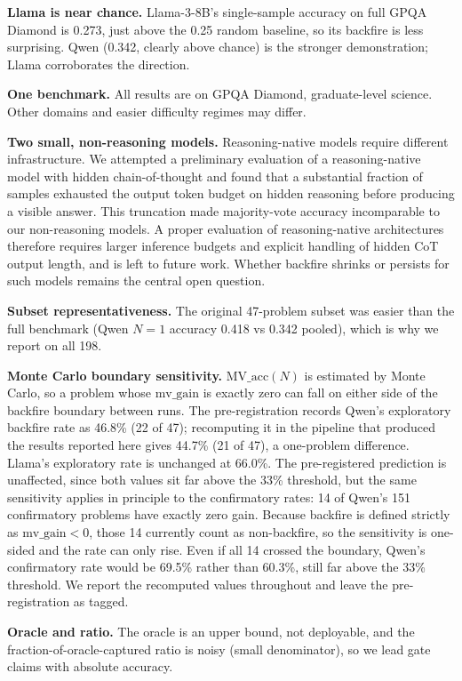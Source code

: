 \documentclass{article}
\begin{document}
\textbf{Llama is near chance.} Llama-3-8B's single-sample accuracy on full
GPQA Diamond is 0.273, just above the 0.25 random baseline, so its backfire
is less surprising. Qwen (0.342, clearly above chance) is the stronger
demonstration; Llama corroborates the direction.

\textbf{One benchmark.} All results are on GPQA Diamond, graduate-level
science. Other domains and easier difficulty regimes may differ.

\textbf{Two small, non-reasoning models.} Reasoning-native models require
different infrastructure. We attempted a preliminary evaluation of a
reasoning-native model with hidden chain-of-thought and found that a
substantial fraction of samples exhausted the output token budget on hidden
reasoning before producing a visible answer. This truncation made
majority-vote accuracy incomparable to our non-reasoning models. A proper
evaluation of reasoning-native architectures therefore requires larger
inference budgets and explicit handling of hidden CoT output length, and is
left to future work. Whether backfire shrinks or persists for such models
remains the central open question.

\textbf{Subset representativeness.} The original 47-problem subset was easier
than the full benchmark (Qwen $N=1$ accuracy 0.418 vs 0.342 pooled), which is
why we report on all 198.

\textbf{Monte Carlo boundary sensitivity.} $\text{MV\_acc}(N)$ is estimated by
Monte Carlo, so a problem whose $\text{mv\_gain}$ is exactly zero can fall on
either side of the backfire boundary between runs. The pre-registration records
Qwen's exploratory backfire rate as 46.8\% (22 of 47); recomputing it in the
pipeline that produced the results reported here gives 44.7\% (21 of 47), a
one-problem difference. Llama's exploratory rate is unchanged at 66.0\%. The
pre-registered prediction is unaffected, since both values sit far above the
33\% threshold, but the same sensitivity applies in principle to the
confirmatory rates: 14 of Qwen's 151 confirmatory problems have exactly zero
gain. Because backfire is defined strictly as $\text{mv\_gain} < 0$, those 14
currently count as non-backfire, so the sensitivity is one-sided and the rate
can only rise. Even if all 14 crossed the boundary, Qwen's confirmatory rate
would be 69.5\% rather than 60.3\%, still far above the 33\% threshold. We
report the recomputed values throughout and leave the pre-registration as
tagged.

\textbf{Oracle and ratio.} The oracle is an upper bound, not deployable, and
the fraction-of-oracle-captured ratio is noisy (small denominator), so we lead
gate claims with absolute accuracy.
\end{document}
